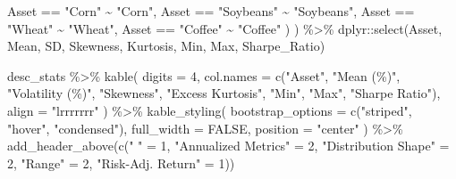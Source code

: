 \documentclass[
  10pt,
  a4paper,
]{article}
\newenvironment{Shaded}{\begin{snugshade}}{\end{snugshade}}
\newcommand{\AttributeTok}[1]{\textcolor[rgb]{0.40,0.45,0.13}{#1}}
\newcommand{\ConstantTok}[1]{\textcolor[rgb]{0.56,0.35,0.01}{#1}}
\newcommand{\DecValTok}[1]{\textcolor[rgb]{0.68,0.00,0.00}{#1}}
\newcommand{\FunctionTok}[1]{\textcolor[rgb]{0.28,0.35,0.67}{#1}}
\newcommand{\NormalTok}[1]{\textcolor[rgb]{0.00,0.23,0.31}{#1}}
\newcommand{\OtherTok}[1]{\textcolor[rgb]{0.00,0.23,0.31}{#1}}
\newcommand{\SpecialCharTok}[1]{\textcolor[rgb]{0.37,0.37,0.37}{#1}}
\newcommand{\StringTok}[1]{\textcolor[rgb]{0.13,0.47,0.30}{#1}}
\begin{document}
\begin{Shaded}
\begin{Highlighting}[]
\NormalTok{      Asset }\SpecialCharTok{==} \StringTok{"Corn"} \SpecialCharTok{\textasciitilde{}} \StringTok{"Corn"}\NormalTok{,}
\NormalTok{      Asset }\SpecialCharTok{==} \StringTok{"Soybeans"} \SpecialCharTok{\textasciitilde{}} \StringTok{"Soybeans"}\NormalTok{, }
\NormalTok{      Asset }\SpecialCharTok{==} \StringTok{"Wheat"} \SpecialCharTok{\textasciitilde{}} \StringTok{"Wheat"}\NormalTok{,}
\NormalTok{      Asset }\SpecialCharTok{==} \StringTok{"Coffee"} \SpecialCharTok{\textasciitilde{}} \StringTok{"Coffee"}
\NormalTok{    )}
\NormalTok{  ) }\SpecialCharTok{\%\textgreater{}\%}
\NormalTok{  dplyr}\SpecialCharTok{::}\FunctionTok{select}\NormalTok{(Asset, Mean, SD, Skewness, Kurtosis, Min, Max, Sharpe\_Ratio)}

\NormalTok{desc\_stats }\SpecialCharTok{\%\textgreater{}\%}
  \FunctionTok{kable}\NormalTok{(}
    \AttributeTok{digits =} \DecValTok{4}\NormalTok{,}
    \AttributeTok{col.names =} \FunctionTok{c}\NormalTok{(}\StringTok{"Asset"}\NormalTok{, }\StringTok{"Mean (\%)"}\NormalTok{, }\StringTok{"Volatility (\%)"}\NormalTok{, }
                  \StringTok{"Skewness"}\NormalTok{, }\StringTok{"Excess Kurtosis"}\NormalTok{, }\StringTok{"Min"}\NormalTok{, }\StringTok{"Max"}\NormalTok{, }\StringTok{"Sharpe Ratio"}\NormalTok{),}
    \AttributeTok{align =} \StringTok{"lrrrrrrr"}
\NormalTok{  ) }\SpecialCharTok{\%\textgreater{}\%}
  \FunctionTok{kable\_styling}\NormalTok{(}
    \AttributeTok{bootstrap\_options =} \FunctionTok{c}\NormalTok{(}\StringTok{"striped"}\NormalTok{, }\StringTok{"hover"}\NormalTok{, }\StringTok{"condensed"}\NormalTok{),}
    \AttributeTok{full\_width =} \ConstantTok{FALSE}\NormalTok{,}
    \AttributeTok{position =} \StringTok{"center"}
\NormalTok{  ) }\SpecialCharTok{\%\textgreater{}\%}
  \FunctionTok{add\_header\_above}\NormalTok{(}\FunctionTok{c}\NormalTok{(}\StringTok{" "} \OtherTok{=} \DecValTok{1}\NormalTok{, }\StringTok{"Annualized Metrics"} \OtherTok{=} \DecValTok{2}\NormalTok{, }\StringTok{"Distribution Shape"} \OtherTok{=} \DecValTok{2}\NormalTok{, }
                     \StringTok{"Range"} \OtherTok{=} \DecValTok{2}\NormalTok{, }\StringTok{"Risk{-}Adj. Return"} \OtherTok{=} \DecValTok{1}\NormalTok{))}
\end{Highlighting}
\end{Shaded}
\end{document}
